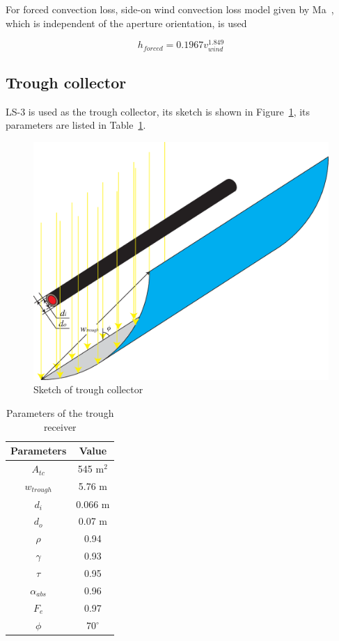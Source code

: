 \documentclass{article}
\begin{document}
For forced convection loss, side-on wind convection loss model given by Ma~\cite{Ma1993}, which is independent of the aperture orientation, is used

\begin{equation*}
	h_{forced}=0.1967v_{wind}^{1.849}
\end{equation*}

\subsection{Trough collector}

LS-3 is used as the trough collector, its sketch is shown in Figure~\ref{fig:tc}, its parameters are listed in Table~\ref{tab:tc}.

\noindent \begin{figure}[htbp]
\begin{center}
	\includegraphics[width = 0.7\columnwidth]{./graphics/troughCollector}
	\caption{Sketch of trough collector}
	\label{fig:tc}
\end{center}
\end{figure}

\begin{table}[htbp]
	\caption{Parameters of the trough receiver}
	\begin{center}
	\begin{tabular}{cc}
		\toprule
		Parameters	&	Value\\
		\midrule
		$A_{tc}$	&	545 m$^2$\\
		$w_{trough}$&	5.76 m\\
		$d_i$		&	0.066 m\\
		$d_o$	&	0.07 m\\
		$\rho$		&	0.94\\
		$\gamma$	&	0.93\\
		$\tau$		&	0.95\\
		$\alpha_{abs}$	&	0.96\\
		$F_e$		&	0.97\\
		$\phi$	&	70$^\circ$\\
		\bottomrule
	\end{tabular}
	\end{center}
	\label{tab:tc}
\end{table}
\end{document}
